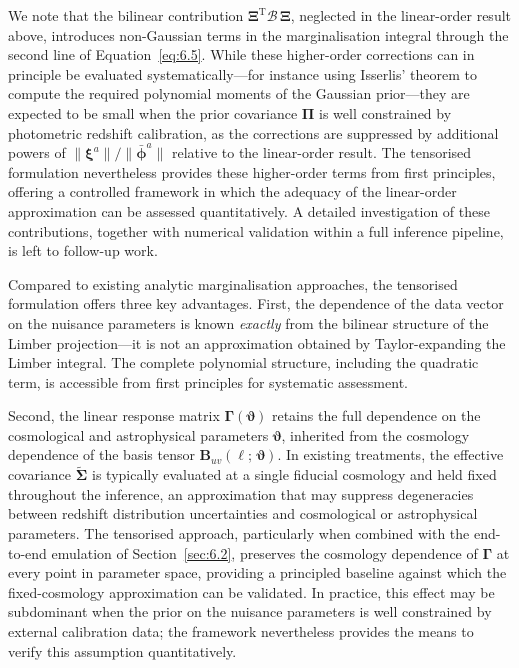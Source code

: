 We note that the bilinear contribution \(\boldsymbol{\Xi}^{\mathrm{T}} \boldsymbol{\mathcal{B}}\, \boldsymbol{\Xi}\), neglected in the linear-order result above, introduces non-Gaussian terms in the marginalisation integral through the second line of Equation~\ref{eq:6.5}. While these higher-order corrections can in principle be evaluated systematically---for instance using Isserlis' theorem \citep{1918Bka....12..134I} to compute the required polynomial moments of the Gaussian prior---they are expected to be small when the prior covariance \(\boldsymbol{\Pi}\) is well constrained by photometric redshift calibration, as the corrections are suppressed by additional powers of \(\lVert \boldsymbol{\xi}^a \rVert / \lVert \bar{\boldsymbol{\phi}}^a \rVert\) relative to the linear-order result. The tensorised formulation nevertheless provides these higher-order terms from first principles, offering a controlled framework in which the adequacy of the linear-order approximation can be assessed quantitatively. A detailed investigation of these contributions, together with numerical validation within a full inference pipeline, is left to follow-up work.

Compared to existing analytic marginalisation approaches, the tensorised formulation offers three key advantages. First, the dependence of the data vector on the nuisance parameters is known \textit{exactly} from the bilinear structure of the Limber projection---it is not an approximation obtained by Taylor-expanding the Limber integral. The complete polynomial structure, including the quadratic term, is accessible from first principles for systematic assessment.

Second, the linear response matrix \(\boldsymbol{\Gamma}(\boldsymbol{\vartheta})\) retains the full dependence on the cosmological and astrophysical parameters \(\boldsymbol{\vartheta}\), inherited from the cosmology dependence of the basis tensor \(\boldsymbol{B}_{uv}(\ell;\,\boldsymbol{\vartheta})\). In existing treatments, the effective covariance \(\tilde{\boldsymbol{\Sigma}}\) is typically evaluated at a single fiducial cosmology and held fixed throughout the inference, an approximation that may suppress degeneracies between redshift distribution uncertainties and cosmological or astrophysical parameters. The tensorised approach, particularly when combined with the end-to-end emulation of Section~\ref{sec:6.2}, preserves the cosmology dependence of \(\boldsymbol{\Gamma}\) at every point in parameter space, providing a principled baseline against which the fixed-cosmology approximation can be validated. In practice, this effect may be subdominant when the prior on the nuisance parameters is well constrained by external calibration data; the framework nevertheless provides the means to verify this assumption quantitatively.

